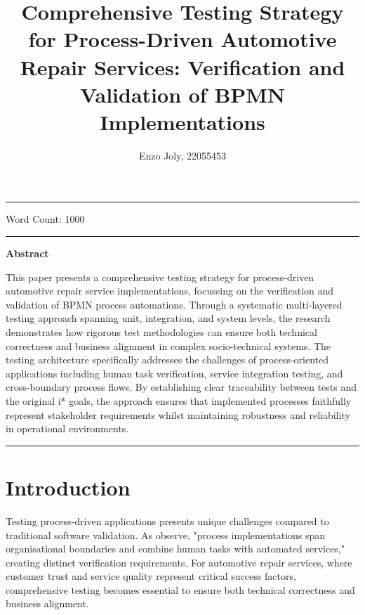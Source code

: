 \documentclass[14pt,a4paper]{article}
\title{Comprehensive Testing Strategy for Process-Driven Automotive Repair Services: Verification and Validation of BPMN Implementations}
\author{Enzo Joly, 22055453}
\date{}
\begin{document}
\maketitle

\hrule

\vspace{3em}

Word Count: 1000

\vspace{3em}
\hrule

\vspace{2em}
\textbf{Abstract}
\vspace{1em}

This paper presents a comprehensive testing strategy for process-driven automotive repair service implementations, focussing on the verification and validation of BPMN process automations. Through a systematic multi-layered testing approach spanning unit, integration, and system levels, the research demonstrates how rigorous test methodologies can ensure both technical correctness and business alignment in complex socio-technical systems. The testing architecture specifically addresses the challenges of process-oriented applications including human task verification, service integration testing, and cross-boundary process flows. By establishing clear traceability between tests and the original i* goals, the approach ensures that implemented processes faithfully represent stakeholder requirements whilst maintaining robustness and reliability in operational environments.

\vspace{3em}
\hrule

\thispagestyle{empty}

\newpage

\tableofcontents
{}

\newpage


\section{Introduction}

Testing process-driven applications presents unique challenges compared to traditional software validation. As \textit{\parencite[p. 127]{Bozkurt2013}} observe, "process implementations span organisational boundaries and combine human tasks with automated services," creating distinct verification requirements. For automotive repair services, where customer trust and service quality represent critical success factors, comprehensive testing becomes essential to ensure both technical correctness and business alignment.
\end{document}
